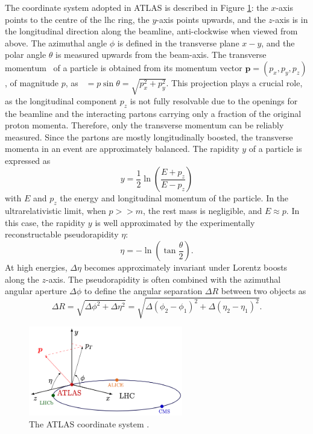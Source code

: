 \newpage
The coordinate system adopted in ATLAS is described in Figure \ref{fig-AtlasCoord}: the $x$-axis points to the centre of the \gls{lhc} ring, the $y$-axis points upwards, and the $z$-axis is in the longitudinal direction along the beamline, anti-clockwise when viewed from above. The azimuthal angle $\phi$ is defined in the transverse plane $x-y$, and the polar angle $\theta$ is measured upwards from the beam-axis. The transverse momentum \pt\ of a particle is obtained from its momentum vector $\boldsymbol{p} = (p_x, p_y, p_z)$, of magnitude $p$, as \pt\ $= p \sin\theta = \sqrt{p_x^2 + p_y^2}$. This projection plays a crucial role, as the longitudinal component $p_z$ is not fully resolvable due to the openings for the beamline and the interacting partons carrying only a fraction of the original proton momenta. Therefore, only the transverse momentum can be reliably measured. Since the partons are mostly longitudinally boosted, the transverse momenta in an event are approximately balanced. The rapidity $y$ of a particle is expressed as 
\begin{equation}
  y = \frac{1}{2} \ln \left(\frac{E + p_z}{E - p_z}\right)
\end{equation}
with $E$ and $p_z$ the energy and longitudinal momentum of the particle. In the ultrarelativistic limit, when $p >> m$, the rest mass is negligible, and $E \approx p$. In this case, the rapidity $y$ is well approximated by the experimentally reconstructable pseudorapidity $\eta$:
\begin{equation}
  \eta = -\ln \left(\tan \frac{\theta}{2}\right).
\end{equation}
At high energies, $\Delta \eta$ becomes approximately invariant under Lorentz boosts along the $z$-axis. The pseudorapidity is often combined with the azimuthal angular aperture $\Delta \phi$ to define the angular separation $\Delta R$ between two objects as
\begin{equation}\label{eq-def-deltaR}
  \Delta R = \sqrt{\Delta \phi^2 + \Delta \eta^2} =  \sqrt{\Delta (\phi_2 - \phi_1)^2 + \Delta (\eta_2 - \eta_1)^2}.
\end{equation}

\begin{figure}[!h]
  \centering
  \includegraphics[width=0.6\textwidth]{Images/ATLAS/atlasCoor.png}
  \caption{The ATLAS coordinate system \cite{Strong:2020mge}.}
  \label{fig-AtlasCoord}
\end{figure}

